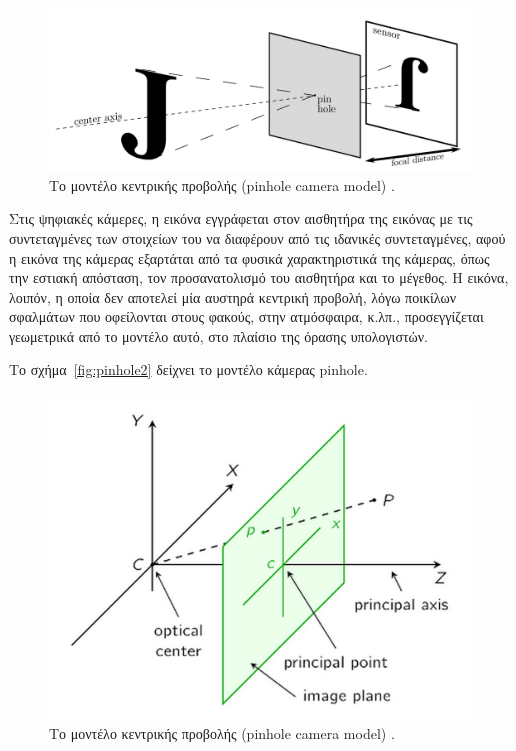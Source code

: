 \begin{figure}[H]
    \centering
    \includegraphics[scale=0.5, angle=0]{Files/Figures/pinhole3.png}
    \caption[Το μοντέλο κεντρικής προβολής (pinhole camera model)]{ Το μοντέλο κεντρικής προβολής (pinhole camera model) \cite{pinhole} .}
    \label{fig:pinhole3}
\end{figure}

Στις ψηφιακές κάμερες, η εικόνα εγγράφεται στον αισθητήρα της εικόνας με τις συντεταγμένες των στοιχείων του να διαφέρουν από τις ιδανικές συντεταγμένες, αφού η εικόνα της κάμερας εξαρτάται από τα φυσικά χαρακτηριστικά της κάμερας, όπως την εστιακή απόσταση, τον προσανατολισμό του αισθητήρα και το μέγεθος. H εικόνα, λοιπόν, η οποία δεν αποτελεί μία αυστηρά κεντρική προβολή, λόγω ποικίλων σφαλμάτων που οφείλονται στους φακούς, στην ατμόσφαιρα, κ.λπ., προσεγγίζεται γεωμετρικά από το μοντέλο αυτό, στο πλαίσιο της όρασης υπολογιστών. 

Το σχήμα~\ref{fig:pinhole2} δείχνει το μοντέλο κάμερας pinhole. 




\begin{figure}[H]
    \centering
    \includegraphics[scale=0.5, angle=0]{Files/Figures/pinhole1.png}
    \caption[Το μοντέλο κεντρικής προβολής στις 3 διαστάσεις (pinhole camera model)]{ Το μοντέλο κεντρικής προβολής (pinhole camera model) \cite{pinhole} .}
    \label{fig:pinhole1}
\end{figure}


